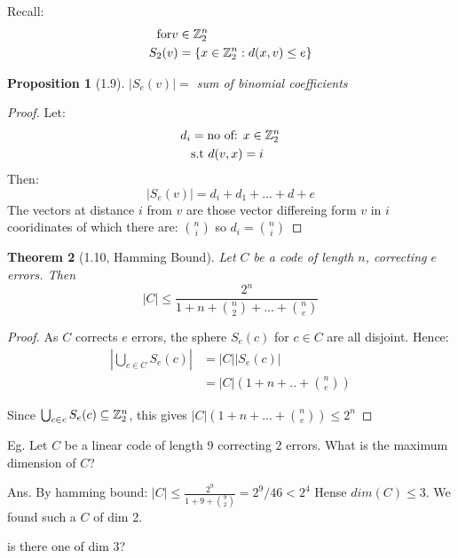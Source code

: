 \documentclass[]{article}
\newtheorem{thm}{Theorem}[section]
\newtheorem{prop}[thm]{Proposition}
\theoremstyle{definition}
\theoremstyle{remark}
\numberwithin{equation}{section}
\begin{document}
		Recall: 
		\begin{align*}
			\text{for} v &\in \mathbb{Z}_2^n \\
				S_2(v) &= \{x \in \mathbb{Z}_2^n: d(x,v)\leq e\}
		\end{align*}

		\begin{prop}[1.9]
			$|S_e(v)| = $ sum of binomial coefficients %
		\end{prop}

		\begin{proof}
			Let:
			\begin{align*}
				d_i &= \text{no of: } x\in \mathbb{Z}_2^n \\
					&\text{s.t } d(v,x) = i
			\end{align*}
			Then:
			\[ |S_e(v)| = d_i + d_1 + ... + d+e\]
			The vectors at distance $i$ from $v$ are those vector differeing form $v$ in $i$ cooridinates of which there are: ${n \choose i}$ so $d_i = {n \choose i}$
		\end{proof}

		\begin{thm}[1.10, Hamming Bound]
			Let $C$ be a code of length $n$, correcting $e$ errors. \newline
			Then \[ |C| \leq \frac{2^n}{1 + n + {n \choose 2} + ... + {n \choose e}}\]
		\end{thm}

		\begin{proof}
			As $C$ corrects $e$ errors, the sphere $S_e(c)$ for $c \in C$ are all disjoint. Hence: \newline
			\begin{align*}
				| \bigcup_{c\in C} S_e(c)| &= |C| | S_e(c)| \\
											&= |C| (1 + n + .. + {n \choose e}) 
			\end{align*}

			Since $\bigcup_{c \in c} S_e(c) \subseteq \mathbb{Z}_2^n$, this gives \newline
			$|C| (1 + n + ... + {n \choose e}) \leq 2^n$
		\end{proof}

		Eg. Let $C$ be a linear code of length 9 correcting 2 errors. What is the maximum dimension of $C$?

		Ans. By hamming bound: \newline
			$|C| \leq \frac{2^9}{1+9+{9 \choose 2}}= 2^9/46 < 2^4$
			Hense $dim(C) \leq 3$.
			We found such a $C$ of dim 2.

			is there one of dim 3?
\end{document}
